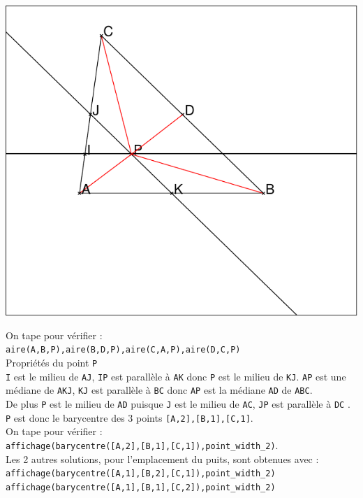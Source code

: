 \documentclass[a4paper,11pt]{book}
\begin{document}
\includegraphics[width=\textwidth]{triangle4}

On tape pour v\'erifier :\\
{\tt aire(A,B,P),aire(B,D,P),aire(C,A,P),aire(D,C,P)}\\

Propri\'et\'es du point {\tt P}\\
{\tt I} est le milieu de {\tt AJ}, {\tt IP} est parall\`ele \`a {\tt AK} 
donc {\tt P} est le milieu de {\tt KJ}.
{\tt AP} est une m\'ediane de {\tt AKJ}, {\tt KJ} est parall\`ele \`a {\tt BC}
donc {\tt AP} est la  m\'ediane {\tt AD} de {\tt ABC}.\\
De plus {\tt P} est le milieu de {\tt AD} puisque {\tt J} est le milieu de 
{\tt AC}, {\tt JP} est parall\`ele \`a {\tt DC} .\\
{\tt P} est donc le barycentre des 3 points {\tt [A,2],[B,1],[C,1]}.\\
On tape pour v\'erifier :\\
{\tt affichage(barycentre([A,2],[B,1],[C,1]),point\_width\_2)}.\\
Les 2 autres solutions, pour l'emplacement du puits, sont obtenues avec :\\
{\tt affichage(barycentre([A,1],[B,2],[C,1]),point\_width\_2)}\\
{\tt affichage(barycentre([A,1],[B,1],[C,2]),point\_width\_2)}\\
\end{document}
